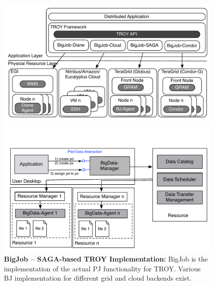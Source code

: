 \documentclass[conference,final]{IEEEtran}
\newcommand{\jhanote}[1]{ {\textcolor{red} { ***shantenu: #1 }}}
\newcommand{\alnote}[1]{ {\textcolor{blue} { ***andre: #1 }}}
\newcommand{\alnote}[1]{}
\newcommand{\jhanote}[1]{}
\begin{document}





\begin{figure}[t]
	\begin{minipage}[b]{0.475\linewidth}
	\centering
	\includegraphics[width=\textwidth]{figures/distributed_pilot_job.pdf}
	\caption{\textbf{BigJob -- SAGA-based TROY Implementation:} BigJob is the implementation of the actual PJ functionality for TROY. Various BJ implementation for different grid and cloud backends exist.}
	\label{fig:figures_distributed_pilot_job}
	\end{minipage}
	\hspace{0.035\linewidth}
	\begin{minipage}[b]{0.475\linewidth}
	\centering
   	\includegraphics[width=\textwidth]{figures/pilot-data-manager.pdf}

\end{minipage}
\end{figure}
\end{document}
